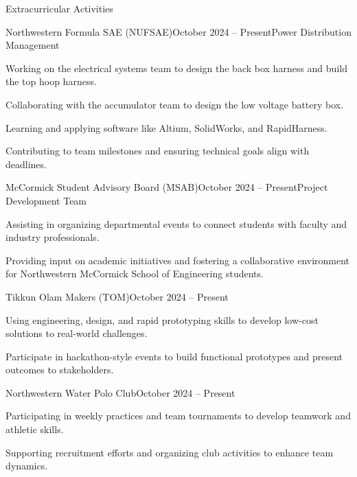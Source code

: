 \documentclass[
	a4paper, %
	10pt, %
]{resume} %
\begin{document}
\begin{rSection}{Extracurricular Activities}

    \begin{rSubsection}{Northwestern Formula SAE (NUFSAE)}{October 2024 -- Present}{Power Distribution Management}{}{}
    	\item Working on the electrical systems team to design the back box harness and build the top hoop harness.
    	\item Collaborating with the accumulator team to design the low voltage battery box.
        	\item Learning and applying software like Altium, SolidWorks, and RapidHarness.
        	\item Contributing to team milestones and ensuring technical goals align with deadlines.
    \end{rSubsection}

    \begin{rSubsection}{McCormick Student Advisory Board (MSAB)}{October 2024 -- Present}{Project Development Team}{}{}
        	\item Assisting in organizing departmental events to connect students with faculty and industry professionals.
        	\item Providing input on academic initiatives and fostering a collaborative environment for Northwestern McCormick School of Engineering  students.
    \end{rSubsection}

    \begin{rSubsection}{Tikkun Olam Makers (TOM)}{October 2024 -- Present}{}{}
        	\item Using engineering, design, and rapid prototyping skills to develop low-cost solutions to real-world challenges.
        	\item Participate in hackathon-style events to build functional prototypes and present outcomes to stakeholders.
    \end{rSubsection}

    \begin{rSubsection}{Northwestern Water Polo Club}{October 2024 -- Present}{}{}
        	\item Participating in weekly practices and team tournaments to develop teamwork and athletic skills.
        	\item Supporting recruitment efforts and organizing club activities to enhance team dynamics.
    \end{rSubsection}

\end{rSection}
\end{document}
